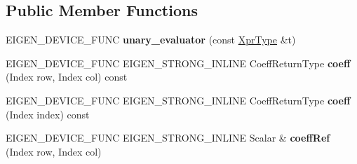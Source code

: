 \subsection*{Public Member Functions}
\begin{DoxyCompactItemize}
\item 
\mbox{\label{struct_eigen_1_1internal_1_1unary__evaluator_3_01_transpose_3_01_arg_type_01_4_00_01_index_based_01_4_aec69cebae400376763e83decca015af7}} 
E\+I\+G\+E\+N\+\_\+\+D\+E\+V\+I\+C\+E\+\_\+\+F\+U\+NC {\bfseries unary\+\_\+evaluator} (const \mbox{\hyperlink{class_eigen_1_1_transpose}{Xpr\+Type}} \&t)
\item 
\mbox{\label{struct_eigen_1_1internal_1_1unary__evaluator_3_01_transpose_3_01_arg_type_01_4_00_01_index_based_01_4_a123bd0c154402081cd60e6af83590024}} 
E\+I\+G\+E\+N\+\_\+\+D\+E\+V\+I\+C\+E\+\_\+\+F\+U\+NC E\+I\+G\+E\+N\+\_\+\+S\+T\+R\+O\+N\+G\+\_\+\+I\+N\+L\+I\+NE Coeff\+Return\+Type {\bfseries coeff} (Index row, Index col) const
\item 
\mbox{\label{struct_eigen_1_1internal_1_1unary__evaluator_3_01_transpose_3_01_arg_type_01_4_00_01_index_based_01_4_aef9506dd163d2f0c59da29512949a9d8}} 
E\+I\+G\+E\+N\+\_\+\+D\+E\+V\+I\+C\+E\+\_\+\+F\+U\+NC E\+I\+G\+E\+N\+\_\+\+S\+T\+R\+O\+N\+G\+\_\+\+I\+N\+L\+I\+NE Coeff\+Return\+Type {\bfseries coeff} (Index index) const
\item 
\mbox{\label{struct_eigen_1_1internal_1_1unary__evaluator_3_01_transpose_3_01_arg_type_01_4_00_01_index_based_01_4_a36722e85b94a79ba766ddc2920b48712}} 
E\+I\+G\+E\+N\+\_\+\+D\+E\+V\+I\+C\+E\+\_\+\+F\+U\+NC E\+I\+G\+E\+N\+\_\+\+S\+T\+R\+O\+N\+G\+\_\+\+I\+N\+L\+I\+NE Scalar \& {\bfseries coeff\+Ref} (Index row, Index col)
\item 
\mbox{\label{struct_eigen_1_1internal_1_1unary__evaluator_3_01_transpose_3_01_arg_type_01_4_00_01_index_based_01_4_ac0c19168aa19c9ac1c1cee6892f8e288}} 

\end{DoxyCompactItemize}
